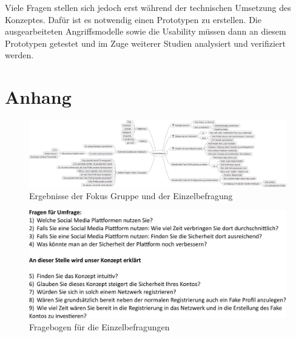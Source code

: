 \documentclass{sigchi}
\begin{document}
Viele Fragen stellen sich jedoch erst während der technischen Umsetzung des Konzeptes. Dafür ist es notwendig einen Prototypen zu erstellen. Die ausgearbeiteten Angriffsmodelle sowie die Usability müssen dann an diesem Prototypen getestet und im Zuge weiterer Studien analysiert und verifiziert werden.




\balance{}





\clearpage
\onecolumn
\section{Anhang}
\begin{figure}[h]
	\centering
	\includegraphics[width=\columnwidth]{figures/Social-Networks.png}
	\caption{Ergebnisse der Fokus Gruppe und der Einzelbefragung}
	\label{fig:MindMapAnhang}
\end{figure}
\begin{figure}[h]
	\centering
	\includegraphics[width=0.8\columnwidth]{figures/Fragebogen.pdf}
	\caption{Fragebogen für die Einzelbefragungen}
	\label{fig:Fragebogen}
\end{figure}
\end{document}

